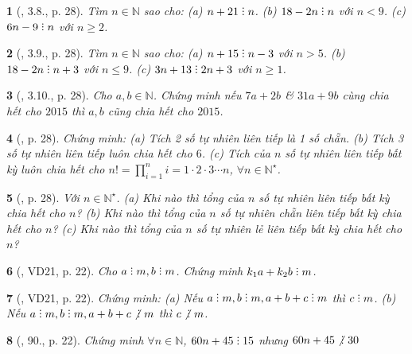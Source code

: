 \documentclass{article}
\newtheorem{baitoan}{}
\DeclareRobustCommand{\divby}{%
	\mathrel{\vbox{\baselineskip.65ex\lineskiplimit0pt\hbox{.}\hbox{.}\hbox{.}}}%
}
\begin{document}
\begin{baitoan}[\cite{Binh_boi_duong_Toan_6_tap_1}, 3.8., p. 28]
	Tìm $n\in\mathbb{N}$ sao cho: (a) $n + 21\divby n$. (b) $18 - 2n\divby n$ với $n < 9$. (c) $6n - 9\divby n$ với $n\ge2$.
\end{baitoan}

\begin{baitoan}[\cite{Binh_boi_duong_Toan_6_tap_1}, 3.9., p. 28]
	Tìm $n\in\mathbb{N}$ sao cho: (a) $n + 15\divby n - 3$ với $n > 5$. (b) $18 - 2n\divby n + 3$ với $n\le9$. (c) $3n + 13\divby2n + 3$ với $n\ge1$.
\end{baitoan}

\begin{baitoan}[\cite{Binh_boi_duong_Toan_6_tap_1}, 3.10., p. 28]
	Cho $a,b\in\mathbb{N}$. Chứng minh nếu $7a + 2b$ \& $31a + 9b$ cùng chia hết cho $2015$ thì $a,b$ cũng chia hết cho $2015$.
\end{baitoan}

\begin{baitoan}[\cite{Binh_boi_duong_Toan_6_tap_1}, p. 28]
	Chứng minh: (a) Tích 2 số tự nhiên liên tiếp là 1 số chẵn. (b) Tích 3 số tự nhiên liên tiếp luôn chia hết cho $6$. (c) Tích của $n$ số tự nhiên liên tiếp bất kỳ luôn chia hết cho $n! = \prod_{i=1}^n i = 1\cdot2\cdot3\cdots n$, $\forall n\in\mathbb{N}^\star$.
\end{baitoan}

\begin{baitoan}[\cite{Binh_boi_duong_Toan_6_tap_1}, p. 28]
	Với $n\in\mathbb{N}^\star$. (a) Khi nào thì tổng của $n$ số tự nhiên liên tiếp bất kỳ chia hết cho $n$? (b) Khi nào thì tổng của $n$ số tự nhiên chẵn liên tiếp bất kỳ chia hết cho $n$? (c) Khi nào thì tổng của $n$ số tự nhiên lẻ liên tiếp bất kỳ chia hết cho $n$?
\end{baitoan}

\begin{baitoan}[\cite{Tuyen_Toan_6}, VD21, p. 22]
	Cho $a\divby m,b\divby m$. Chứng minh $k_1a + k_2b\divby m$.
\end{baitoan}

\begin{baitoan}[\cite{Tuyen_Toan_6}, VD21, p. 22]
	Chứng minh: (a) Nếu $a\divby m,b\divby m,a + b + c\divby m$ thì $c\divby m$. (b) Nếu $a\divby m,b\divby m,a + b + c\not{\divby}\ m$ thì $c\not{\divby}\ m$.
\end{baitoan}

\begin{baitoan}[\cite{Tuyen_Toan_6}, 90., p. 22]
	Chứng minh $\forall n\in\mathbb{N}$, $60n + 45\divby15$ nhưng $60n + 45\not{\divby}\ 30$
\end{baitoan}
\end{document}
